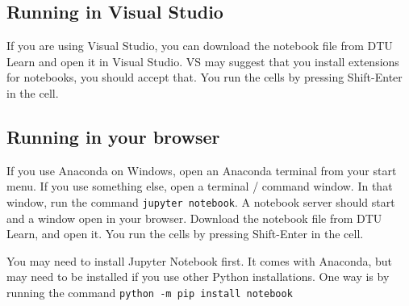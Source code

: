 \documentclass[a4paper,11pt]{article}
\begin{document}
\subsection{Running in Visual Studio}

If you are using Visual Studio, you can download the notebook file
from DTU Learn and open it in Visual Studio.  VS may suggest that you
install extensions for notebooks, you should accept that.  You run the
cells by pressing Shift-Enter in the cell.

\subsection{Running in your browser}

If you use Anaconda on Windows, open an Anaconda terminal from your
start menu.  If you use something else, open a terminal / command
window.  In that window, run the command \texttt{jupyter notebook}.  A
notebook server should start and a window open in your browser.
Download the notebook file from DTU Learn, and open it.  You run the
cells by pressing Shift-Enter in the cell.

You may need to install Jupyter Notebook first.  It comes with
Anaconda, but may need to be installed if you use other Python
installations.  One way is by running the command \texttt{python -m
  pip install notebook}
\end{document}
